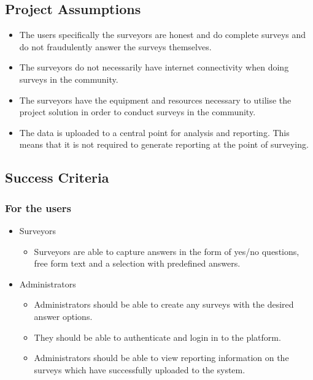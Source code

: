 \documentclass[12pt]{witseiepaper}
\begin{document}
\subsection{Project Assumptions}
\begin{itemize}
  \item The users specifically the surveyors are honest and do complete surveys and do not fraudulently answer the surveys themselves.
  \item The surveyors do not necessarily have internet connectivity when doing surveys in the community.
  \item The surveyors have the equipment and resources necessary to utilise the project solution in order to conduct surveys in the community.
  \item The data is uploaded to a central point for analysis and reporting. This means that it is not required to generate reporting at the point of surveying.
\end{itemize}


\subsection{Success Criteria}
\subsubsection{For the users}
\begin{itemize}
  \item Surveyors \begin{itemize}
  \item Surveyors are able to capture answers in the form of yes/no questions, free form text and a selection with predefined answers.
  \end{itemize}
    \item Administrators \begin{itemize}
  \item Administrators should be able to create any surveys with the desired answer options.
  \item They should be able to authenticate and login in to the platform.
  \item Administrators should be able to view reporting information on the surveys which have successfully uploaded to the system.
  \end{itemize}

\end{itemize}
\end{document}
